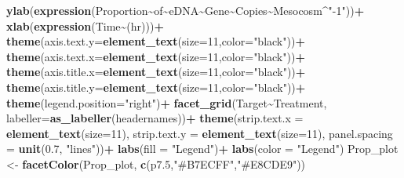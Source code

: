 \documentclass[
]{article}
\newenvironment{Shaded}{\begin{snugshade}}{\end{snugshade}}
\newcommand{\AttributeTok}[1]{\textcolor[rgb]{0.13,0.29,0.53}{#1}}
\newcommand{\DecValTok}[1]{\textcolor[rgb]{0.00,0.00,0.81}{#1}}
\newcommand{\FloatTok}[1]{\textcolor[rgb]{0.00,0.00,0.81}{#1}}
\newcommand{\FunctionTok}[1]{\textcolor[rgb]{0.13,0.29,0.53}{\textbf{#1}}}
\newcommand{\NormalTok}[1]{#1}
\newcommand{\OtherTok}[1]{\textcolor[rgb]{0.56,0.35,0.01}{#1}}
\newcommand{\SpecialCharTok}[1]{\textcolor[rgb]{0.81,0.36,0.00}{\textbf{#1}}}
\newcommand{\StringTok}[1]{\textcolor[rgb]{0.31,0.60,0.02}{#1}}
\begin{document}
\begin{Shaded}
\begin{Highlighting}[]
  \FunctionTok{ylab}\NormalTok{(}\FunctionTok{expression}\NormalTok{(Proportion}\SpecialCharTok{\textasciitilde{}}\NormalTok{of}\SpecialCharTok{\textasciitilde{}}\NormalTok{eDNA}\SpecialCharTok{\textasciitilde{}}\NormalTok{Gene}\SpecialCharTok{\textasciitilde{}}\NormalTok{Copies}\SpecialCharTok{\textasciitilde{}}\NormalTok{Mesocosm}\SpecialCharTok{\^{}}\StringTok{"{-}1"}\NormalTok{))}\SpecialCharTok{+}
  \FunctionTok{xlab}\NormalTok{(}\FunctionTok{expression}\NormalTok{(Time}\SpecialCharTok{\textasciitilde{}}\NormalTok{(hr)))}\SpecialCharTok{+}
  \FunctionTok{theme}\NormalTok{(}\AttributeTok{axis.text.y=}\FunctionTok{element\_text}\NormalTok{(}\AttributeTok{size=}\DecValTok{11}\NormalTok{,}\AttributeTok{color=}\StringTok{"black"}\NormalTok{))}\SpecialCharTok{+}
  \FunctionTok{theme}\NormalTok{(}\AttributeTok{axis.text.x=}\FunctionTok{element\_text}\NormalTok{(}\AttributeTok{size=}\DecValTok{11}\NormalTok{,}\AttributeTok{color=}\StringTok{"black"}\NormalTok{))}\SpecialCharTok{+}
  \FunctionTok{theme}\NormalTok{(}\AttributeTok{axis.title.x=}\FunctionTok{element\_text}\NormalTok{(}\AttributeTok{size=}\DecValTok{11}\NormalTok{,}\AttributeTok{color=}\StringTok{"black"}\NormalTok{))}\SpecialCharTok{+}
  \FunctionTok{theme}\NormalTok{(}\AttributeTok{axis.title.y=}\FunctionTok{element\_text}\NormalTok{(}\AttributeTok{size=}\DecValTok{11}\NormalTok{,}\AttributeTok{color=}\StringTok{"black"}\NormalTok{))}\SpecialCharTok{+}
  \FunctionTok{theme}\NormalTok{(}\AttributeTok{legend.position=}\StringTok{"right"}\NormalTok{)}\SpecialCharTok{+}
  \FunctionTok{facet\_grid}\NormalTok{(Target}\SpecialCharTok{\textasciitilde{}}\NormalTok{Treatment, }\AttributeTok{labeller=}\FunctionTok{as\_labeller}\NormalTok{(headernames))}\SpecialCharTok{+}
  \FunctionTok{theme}\NormalTok{(}\AttributeTok{strip.text.x =} \FunctionTok{element\_text}\NormalTok{(}\AttributeTok{size=}\DecValTok{11}\NormalTok{),}
        \AttributeTok{strip.text.y =} \FunctionTok{element\_text}\NormalTok{(}\AttributeTok{size=}\DecValTok{11}\NormalTok{),}
        \AttributeTok{panel.spacing =} \FunctionTok{unit}\NormalTok{(}\FloatTok{0.7}\NormalTok{, }\StringTok{"lines"}\NormalTok{))}\SpecialCharTok{+}
  \FunctionTok{labs}\NormalTok{(}\AttributeTok{fill =} \StringTok{"Legend"}\NormalTok{)}\SpecialCharTok{+}
  \FunctionTok{labs}\NormalTok{(}\AttributeTok{color =} \StringTok{"Legend"}\NormalTok{)}
\NormalTok{Prop\_plot }\OtherTok{\textless{}{-}} \FunctionTok{facetColor}\NormalTok{(Prop\_plot, }\FunctionTok{c}\NormalTok{(p7}\FloatTok{.5}\NormalTok{,}\StringTok{"\#B7ECFF"}\NormalTok{,}\StringTok{"\#E8CDE9"}\NormalTok{))}
\end{Highlighting}
\end{Shaded}
\end{document}
